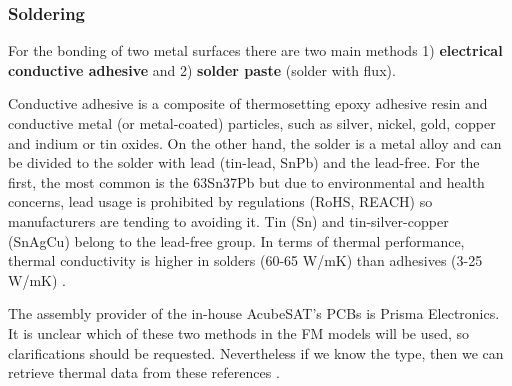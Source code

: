 \documentclass[final]{cubedoc}
\begin{document}
	\subsubsection{Soldering}
	
	
	For the bonding of two metal surfaces there are two main methods 1) \textbf{electrical conductive adhesive} and 2) \textbf{solder paste} (solder with flux). 
	
	
	Conductive adhesive is a composite of thermosetting epoxy adhesive resin and conductive metal (or metal-coated) particles, such as silver, nickel, gold, copper and indium or tin oxides. On the other hand, the solder is a metal alloy and can be divided to the solder with lead (tin-lead, SnPb) and the lead-free. For the first, the most common is the 63Sn37Pb but due to environmental and health concerns, lead usage is prohibited by regulations (RoHS, REACH) so manufacturers are tending to avoiding it. Tin (Sn) and tin-silver-copper (SnAgCu) belong to the lead-free group. In terms of thermal performance, thermal conductivity is higher in solders (60-65 W/mK) than adhesives (3-25 W/mK) \cite{leadvssolde}. 
	
	The assembly provider of the in-house AcubeSAT's PCBs is Prisma Electronics. It is unclear which of these two methods in the FM models will be used, so clarifications should be requested. Nevertheless if we know the type, then we can retrieve thermal data from these references \cite{solder, wiki:solderalloys, propemetalengedge}.
	
	
	
	
\end{document}
